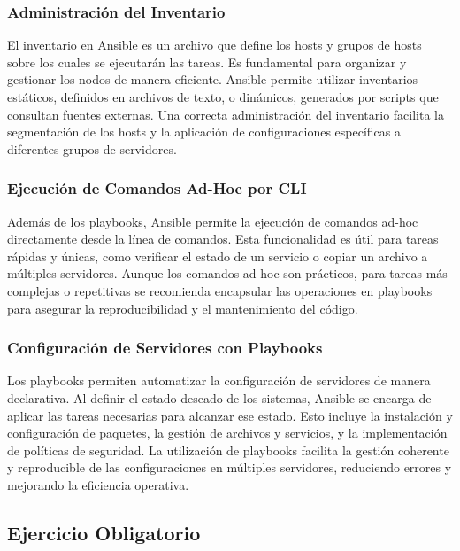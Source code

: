 \subsubsection{Administración del Inventario}

El inventario en Ansible es un archivo que define los hosts y grupos de hosts sobre los cuales se ejecutarán las tareas. Es fundamental para organizar y gestionar los nodos de manera eficiente. Ansible permite utilizar inventarios estáticos, definidos en archivos de texto, o dinámicos, generados por scripts que consultan fuentes externas. Una correcta administración del inventario facilita la segmentación de los hosts y la aplicación de configuraciones específicas a diferentes grupos de servidores.

\subsubsection{Ejecución de Comandos Ad-Hoc por CLI}

Además de los playbooks, Ansible permite la ejecución de comandos ad-hoc directamente desde la línea de comandos. Esta funcionalidad es útil para tareas rápidas y únicas, como verificar el estado de un servicio o copiar un archivo a múltiples servidores. Aunque los comandos ad-hoc son prácticos, para tareas más complejas o repetitivas se recomienda encapsular las operaciones en playbooks para asegurar la reproducibilidad y el mantenimiento del código.

\subsubsection{Configuración de Servidores con Playbooks}

Los playbooks permiten automatizar la configuración de servidores de manera declarativa. Al definir el estado deseado de los sistemas, Ansible se encarga de aplicar las tareas necesarias para alcanzar ese estado. Esto incluye la instalación y configuración de paquetes, la gestión de archivos y servicios, y la implementación de políticas de seguridad. La utilización de playbooks facilita la gestión coherente y reproducible de las configuraciones en múltiples servidores, reduciendo errores y mejorando la eficiencia operativa.


\subsection{Ejercicio Obligatorio}

